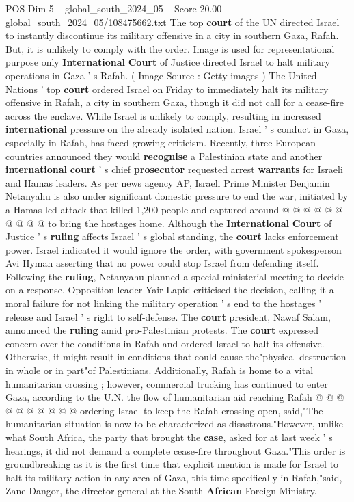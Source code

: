 \begin{textsample}{POS Dim 5 – global\_south\_2024\_05 – Score 20.00 – global\_south\_2024\_05/108475662.txt}  \label{ex:f5_pos_121}
The top \textbf{court} of the UN directed Israel to instantly discontinue its military offensive in a city in southern Gaza, Rafah.
But, it is unlikely to comply with the order.
Image is used for representational purpose only \textbf{International} \textbf{Court} of Justice directed Israel to halt military operations in Gaza ' s Rafah. ( Image Source : Getty images ) The United Nations ' top \textbf{court} ordered Israel on Friday to immediately halt its military offensive in Rafah, a city in southern Gaza, though it did not call for a cease-fire across the enclave.
While Israel is unlikely to comply, resulting in increased \textbf{international} pressure on the already isolated nation.
Israel ' s conduct in Gaza, especially in Rafah, has faced growing criticism.
Recently, three European countries announced they would \textbf{recognise} a Palestinian state and another \textbf{international} \textbf{court} ' s chief \textbf{prosecutor} requested arrest \textbf{warrants} for Israeli and Hamas leaders.
As per news agency AP, Israeli Prime Minister Benjamin Netanyahu is also under significant domestic pressure to end the war, initiated by a Hamas-led attack that killed 1,200 people and captured around @ @ @ @ @ @ @ @ @ @ to bring the hostages home.
Although the \textbf{International} \textbf{Court} of Justice ' s \textbf{ruling} affects Israel ' s global standing, the \textbf{court} lacks enforcement power.
Israel indicated it would ignore the order, with government spokesperson Avi Hyman asserting that no power could stop Israel from defending itself.
Following the \textbf{ruling}, Netanyahu planned a special ministerial meeting to decide on a response.
Opposition leader Yair Lapid criticised the decision, calling it a moral failure for not linking the military operation ' s end to the hostages ' release and Israel ' s right to self-defense.
The \textbf{court} president, Nawaf Salam, announced the \textbf{ruling} amid pro-Palestinian protests.
The \textbf{court} expressed concern over the conditions in Rafah and ordered Israel to halt its offensive.
Otherwise, it might result in conditions that could cause the"physical destruction in whole or in part"of Palestinians.
Additionally, Rafah is home to a vital humanitarian crossing ; however, commercial trucking has continued to enter Gaza, according to the U.N. the flow of humanitarian aid reaching Rafah @ @ @ @ @ @ @ @ @ @ ordering Israel to keep the Rafah crossing open, said,"The humanitarian situation is now to be characterized as disastrous."However, unlike what South Africa, the party that brought the \textbf{case}, asked for at last week ' s hearings, it did not demand a complete cease-fire throughout Gaza."This order is groundbreaking as it is the first time that explicit mention is made for Israel to halt its military action in any area of Gaza, this time specifically in Rafah,"said, Zane Dangor, the director general at the South \textbf{African} Foreign Ministry.

\end{textsample}
